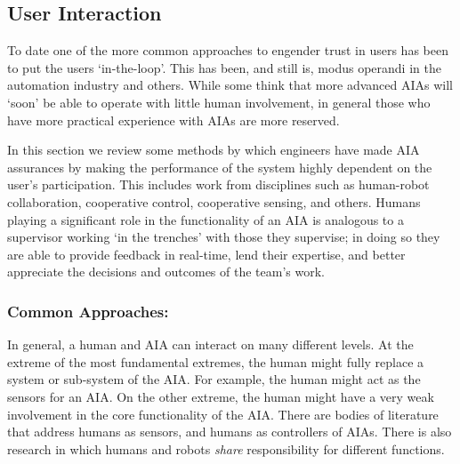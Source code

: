 \subsection{User Interaction} \label{sec:user_interaction}
To date one of the more common approaches to engender trust in users has been to put the users `in-the-loop'. This has been, and still is, modus operandi in the automation industry and others. While some think that more advanced AIAs will `soon' be able to operate with little human involvement, in general those who have more practical experience with AIAs are more reserved.

In this section we review some methods by which engineers have made AIA assurances by making the performance of the system highly dependent on the user's participation. This includes work from disciplines such as human-robot collaboration, cooperative control, cooperative sensing, and others. Humans playing a significant role in the functionality of an AIA is analogous to a supervisor working `in the trenches' with those they supervise; in doing so they are able to provide feedback in real-time, lend their expertise, and better appreciate the decisions and outcomes of the team's work.

\subsubsection{Common Approaches:}
 

In general, a human and AIA can interact on many different levels. At the extreme of the most fundamental extremes, the human might fully replace a system or sub-system of the AIA. For example, the human might act as the sensors for an AIA. On the other extreme, the human might have a very weak involvement in the core functionality of the AIA. There are bodies of literature that address humans as sensors, and humans as controllers of AIAs. There is also research in which humans and robots \emph{share} responsibility for different functions.

